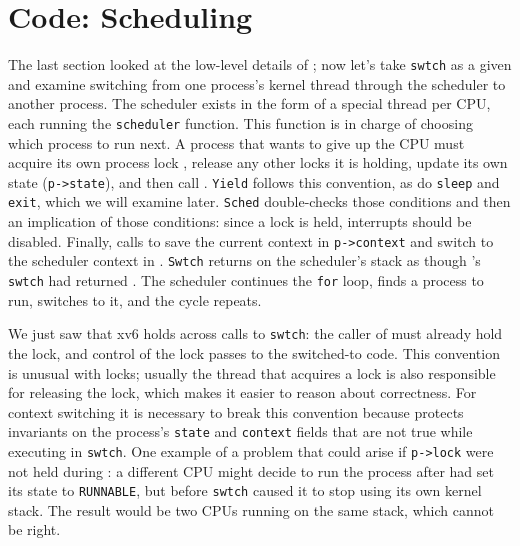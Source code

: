 \section{Code: Scheduling}

The last section looked at the low-level details of
;
now let's take 
\lstinline{swtch}
as a given and examine 
switching from one process's kernel thread
through the scheduler to another process.
The scheduler exists in the form of a special thread per CPU, each running the
\lstinline{scheduler}
function.
This function is in charge of choosing which process to run next.
A process
that wants to give up the CPU must
acquire its own process lock
,
release any other locks it is holding,
update its own state
(\lstinline{p->state}),
and then call
.
\lstinline{Yield}
follows this convention, as do
\texttt{sleep}
and
\texttt{exit},
which we will examine later.
\lstinline{Sched}
double-checks those conditions
and then an implication of those conditions:
since a lock is held, interrupts should be disabled.
Finally,
calls
to save the current context in 
\lstinline{p->context}
and switch to the scheduler context in
.
\lstinline{Swtch}
returns on the scheduler's stack
as though
's
\lstinline{swtch}
had returned
.
The scheduler continues the 
\lstinline{for}
loop, finds a process to run, 
switches to it, and the cycle repeats.

We just saw that xv6 holds
across calls to
\lstinline{swtch}:
the caller of
must already hold the lock, and control of the lock passes to the
switched-to code.  This convention is unusual with locks; usually
the thread that acquires a lock is also responsible for
releasing the lock, which makes it easier to reason about correctness.
For context switching it is necessary to break this convention because
protects invariants on the process's
\lstinline{state}
and
\lstinline{context}
fields that are not true while executing in
\lstinline{swtch}.
One example of a problem that could arise if
\lstinline{p->lock}
were not held during
:
a different CPU might decide
to run the process after 
had set its state to
\lstinline{RUNNABLE},
but before 
\lstinline{swtch}
caused it to stop using its own kernel stack.
The result would be two CPUs running on the same stack,
which cannot be right.

